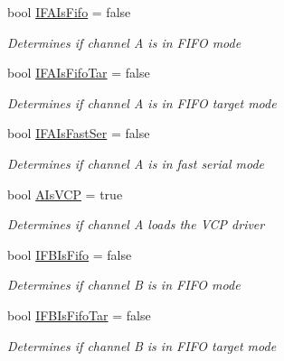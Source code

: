 \begin{DoxyCompactItemize}
bool \mbox{\hyperlink{class_f_t_d2_x_x___n_e_t_1_1_f_t_d_i_1_1_f_t2232_h___e_e_p_r_o_m___s_t_r_u_c_t_u_r_e_a0d3b83676c9afd0915c2fec80163b839}{I\+F\+A\+Is\+Fifo}} = false
\begin{DoxyCompactList}\small\item\em Determines if channel A is in F\+I\+FO mode \end{DoxyCompactList}\item 
bool \mbox{\hyperlink{class_f_t_d2_x_x___n_e_t_1_1_f_t_d_i_1_1_f_t2232_h___e_e_p_r_o_m___s_t_r_u_c_t_u_r_e_a5f0e76e98f1b1498337195f17769da63}{I\+F\+A\+Is\+Fifo\+Tar}} = false
\begin{DoxyCompactList}\small\item\em Determines if channel A is in F\+I\+FO target mode \end{DoxyCompactList}\item 
bool \mbox{\hyperlink{class_f_t_d2_x_x___n_e_t_1_1_f_t_d_i_1_1_f_t2232_h___e_e_p_r_o_m___s_t_r_u_c_t_u_r_e_a8ca1a310d183af6ac371f7f38087e8ea}{I\+F\+A\+Is\+Fast\+Ser}} = false
\begin{DoxyCompactList}\small\item\em Determines if channel A is in fast serial mode \end{DoxyCompactList}\item 
bool \mbox{\hyperlink{class_f_t_d2_x_x___n_e_t_1_1_f_t_d_i_1_1_f_t2232_h___e_e_p_r_o_m___s_t_r_u_c_t_u_r_e_a9bbde66a6b67e9fc7053649f72f65758}{A\+Is\+V\+CP}} = true
\begin{DoxyCompactList}\small\item\em Determines if channel A loads the V\+CP driver \end{DoxyCompactList}\item 
bool \mbox{\hyperlink{class_f_t_d2_x_x___n_e_t_1_1_f_t_d_i_1_1_f_t2232_h___e_e_p_r_o_m___s_t_r_u_c_t_u_r_e_ad7472e60f6217a4a3f735b3e1ad5b1d4}{I\+F\+B\+Is\+Fifo}} = false
\begin{DoxyCompactList}\small\item\em Determines if channel B is in F\+I\+FO mode \end{DoxyCompactList}\item 
bool \mbox{\hyperlink{class_f_t_d2_x_x___n_e_t_1_1_f_t_d_i_1_1_f_t2232_h___e_e_p_r_o_m___s_t_r_u_c_t_u_r_e_ac1037e0b7321c0edc487f1c70890dcc8}{I\+F\+B\+Is\+Fifo\+Tar}} = false
\begin{DoxyCompactList}\small\item\em Determines if channel B is in F\+I\+FO target mode \end{DoxyCompactList}\item 

\end{DoxyCompactItemize}

